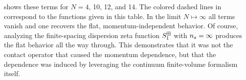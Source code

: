  shows these terms for $N=4$, 10, 12, and 14.
The colored dashed lines in  correspond to the functions given in this table.  In the limit $N\mapsto\infty$ all terms vanish and one recovers the flat, momentum-independent behavior.
Of course, analyzing the finite-spacing dispersion zeta function $S^{\boxplus}_1$ with ${n_s}=\infty$ produces the flat behavior all the way through.
This demonstrates that it was not the contact operator that caused the momentum dependence, but that the dependence was induced by leveraging the continuum finite-volume formalism itself.
